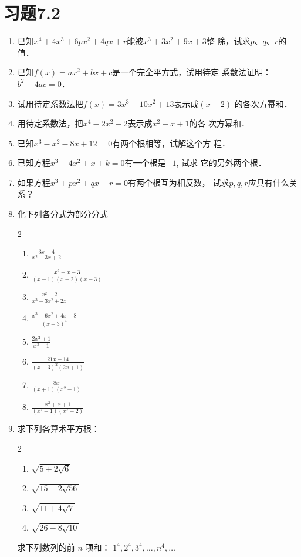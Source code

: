 \section*{习题7.2}
\begin{enumerate}
    \item 已知$x^4+4x^3+6px^2+4qx+r$能被$x^3+3x^2+9x+3$整
    除，试求$p$、$q$、$r$的值．
    \item 已知$f(x)=ax^2+bx+c$是一个完全平方式，试用待定
    系数法证明：$b^2-4ac=0$．
    \item 试用待定系数法把$f(x)=3x^3-10x^2+13$表示成$(x-2)$
    的各次方幂和．
    \item 用待定系数法，把$x^4-2x^2-2$表示成$x^2-x+1$的各
    次方幂和．
    \item 已知$x^3-x^2-8x+12=0$有两个根相等，试解这个方
    程．
    \item 已知方程$x^3-4x^2+x+k=0$有一个根是$-1$, 试求
    它的另外两个根．
    \item  如果方程$x^3+px^2+qx+r=0$有两个根互为相反数，
    试求$p,q,r$应具有什么关系？
    \item  化下列各分式为部分分式
    \begin{multicols}{2}
  \begin{enumerate}
\item  $\frac{3 x-4}{x^{2}-3 x+2}$
\item  $\frac{x^{2}+x-3}{(x-1)(x-2)(x-3)}$
\item $\frac{x^{2}-2}{x^{3}-3 x^{2}+2 x}$
\item  $\frac{x^{3}-6 x^{2}+4 x+8}{(x-3)^{4}}$
\item  $\frac{2 x^{2}+1}{x^{3}-1}$
\item  $\frac{21 x-14}{(x-3)^{2}(2 x+1)}$
\item  $\frac{8 x}{(x+1)\left(x^{2}-1\right)}$
\item  $\frac{x^{2}+x+1}{\left(x^{2}+1\right)\left(x^{2}+2\right)}$
\end{enumerate}      
    \end{multicols}

\item 求下列各算术平方根：
\begin{multicols}{2}
   \begin{enumerate}
    \item  $\sqrt{5+2 \sqrt{6}}$
    \item  $\sqrt{15-2 \sqrt{56}}$
    \item  $\sqrt{11+4 \sqrt{7}}$
    \item  $\sqrt{26-8 \sqrt{10}}$  
\end{enumerate}     
\end{multicols}

\staritem 求下列数列的前 $n$ 项和：
    $1^{4}, 2^{4}, 3^{4}, \ldots , n^{4}, \ldots$

\end{enumerate}






